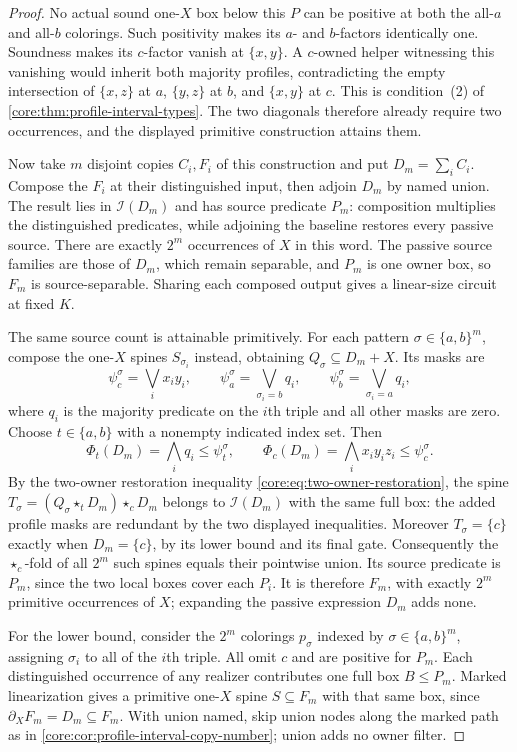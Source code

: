 \begin{proof}
No actual sound one-$X$ box below this $P$ can be positive at both the
all-$a$ and all-$b$ colorings. Such positivity makes its $a$- and
$b$-factors identically one. Soundness makes its $c$-factor vanish at
$\{x,y\}$. A $c$-owned helper witnessing this vanishing would inherit
both majority profiles, contradicting the empty intersection of
$\{x,z\}$ at $a$, $\{y,z\}$ at $b$, and $\{x,y\}$ at $c$.
This is condition~(2) of \cref{core:thm:profile-interval-types}.
The two diagonals therefore already require two occurrences, and the
displayed primitive construction attains them.

Now take $m$ disjoint copies $C_i,F_i$ of this construction and put
$D_m=\sum_i C_i$. Compose the $F_i$ at their distinguished input,
then adjoin $D_m$ by named union. The result lies in
$\mathcal I(D_m)$ and has source predicate $P_m$:
composition multiplies the distinguished predicates, while adjoining
the baseline restores every passive source.
There are exactly $2^m$ occurrences of $X$ in this word.
The passive source families are those of $D_m$, which remain separable,
and $P_m$ is one owner box, so $F_m$ is source-separable.
Sharing each composed output gives a linear-size circuit at fixed $K$.

The same source count is attainable primitively. For each pattern
$\sigma\in\{a,b\}^m$, compose the one-$X$ spines $S_{\sigma_i}$
instead, obtaining $Q_\sigma\subseteq D_m+X$. Its masks are
\[
 \psi_c^\sigma=\bigvee_i x_i y_i,\qquad
 \psi_a^\sigma=\bigvee_{\sigma_i=b}q_i,\qquad
 \psi_b^\sigma=\bigvee_{\sigma_i=a}q_i,
\]
where $q_i$ is the majority predicate on the $i$th triple and all
other masks are zero. Choose $t\in\{a,b\}$ with a nonempty indicated
index set. Then
\[
 \Phi_t(D_m)=\bigwedge_i q_i\leq\psi_t^\sigma,\qquad
 \Phi_c(D_m)=\bigwedge_i x_i y_i z_i\leq\psi_c^\sigma.
\]
By the two-owner restoration inequality
\eqref{core:eq:two-owner-restoration}, the spine
$T_\sigma=(Q_\sigma\star_t D_m)\star_c D_m$ belongs to
$\mathcal I(D_m)$ with the same full box: the added profile masks
are redundant by the two displayed inequalities.
Moreover $T_\sigma=\{c\}$ exactly when $D_m=\{c\}$, by its lower
bound and its final gate. Consequently the $\star_c$-fold of all
$2^m$ such spines equals their pointwise union.
Its source predicate is $P_m$, since the two local boxes cover each
$P_i$. It is therefore $F_m$, with exactly $2^m$ primitive occurrences
of $X$; expanding the passive expression $D_m$ adds none.

For the lower bound, consider the $2^m$ colorings $p_\sigma$ indexed
by $\sigma\in\{a,b\}^m$, assigning $\sigma_i$ to all of the $i$th
triple. All omit $c$ and are positive for $P_m$.
Each distinguished occurrence of any realizer contributes one full box
$B\leq P_m$. Marked linearization gives a primitive one-$X$ spine
$S\subseteq F_m$ with that same box, since
$\partial_XF_m=D_m\subseteq F_m$.
With union named, skip union nodes along the marked path as in
\cref{core:cor:profile-interval-copy-number}; union adds no owner filter.


\end{proof}

